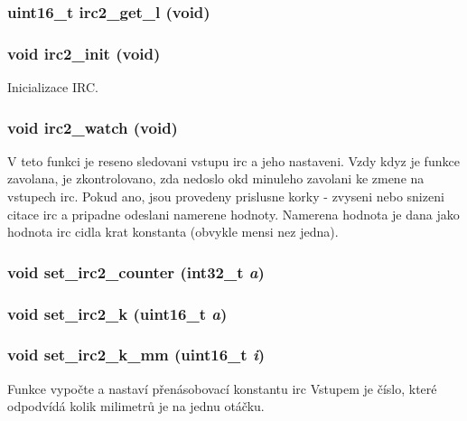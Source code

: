 \subsubsection[{irc2\_\-get\_\-l}]{\setlength{\rightskip}{0pt plus 5cm}uint16\_\-t irc2\_\-get\_\-l (void)}\label{irc2_8c_a9a7f216fac24f1bb5342700bdfcc865a}
\subsubsection[{irc2\_\-init}]{\setlength{\rightskip}{0pt plus 5cm}void irc2\_\-init (void)}\label{irc2_8c_a82d08977a4cf71b6cad65346a58ec837}
Inicializace IRC. 
\subsubsection[{irc2\_\-watch}]{\setlength{\rightskip}{0pt plus 5cm}void irc2\_\-watch (void)}\label{irc2_8c_ac24ca6f0906ccdfb6ffe65d2a28abaf7}
V teto funkci je reseno sledovani vstupu irc a jeho nastaveni. Vzdy kdyz je funkce zavolana, je zkontrolovano, zda nedoslo okd minuleho zavolani ke zmene na vstupech irc. Pokud ano, jsou provedeny prislusne korky -\/ zvyseni nebo snizeni citace irc a pripadne odeslani namerene hodnoty. Namerena hodnota je dana jako hodnota irc cidla krat konstanta (obvykle mensi nez jedna). 
\subsubsection[{set\_\-irc2\_\-counter}]{\setlength{\rightskip}{0pt plus 5cm}void set\_\-irc2\_\-counter (int32\_\-t {\em a})}\label{irc2_8c_abe8163b2ba712f1a83891ce75e903037}
\subsubsection[{set\_\-irc2\_\-k}]{\setlength{\rightskip}{0pt plus 5cm}void set\_\-irc2\_\-k (uint16\_\-t {\em a})}\label{irc2_8c_aca073e77760684114a3d1f46adef8efc}
\subsubsection[{set\_\-irc2\_\-k\_\-mm}]{\setlength{\rightskip}{0pt plus 5cm}void set\_\-irc2\_\-k\_\-mm (uint16\_\-t {\em i})}\label{irc2_8c_a20d90a499e8980683f9c54225e397a9f}
Funkce vypočte a nastaví přenásobovací konstantu irc Vstupem je číslo, které odpodvídá kolik milimetrů je na jednu otáčku. 
